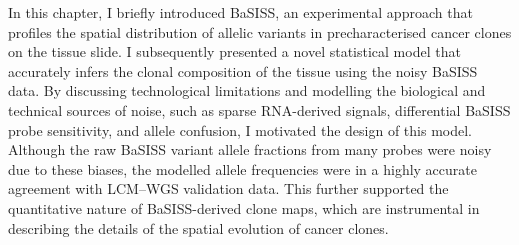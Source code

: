 In this chapter, I briefly introduced \acf{BaSISS}, an experimental approach that profiles the spatial distribution of allelic variants in precharacterised cancer clones on the tissue slide. I subsequently presented a novel statistical model that accurately infers the clonal composition of the tissue using the noisy \ac{BaSISS} data. By discussing technological limitations and modelling the biological and technical sources of noise, such as sparse RNA-derived signals, differential \ac{BaSISS} probe sensitivity, and allele confusion, I motivated the design of this model. Although the raw \ac{BaSISS} variant allele fractions from many probes were noisy due to these biases, the modelled allele frequencies were in a highly accurate agreement with \ac{LCM}–\ac{WGS} validation data. This further supported the quantitative nature of \ac{BaSISS}-derived clone maps, which are instrumental in describing the details of the spatial evolution of cancer clones. 